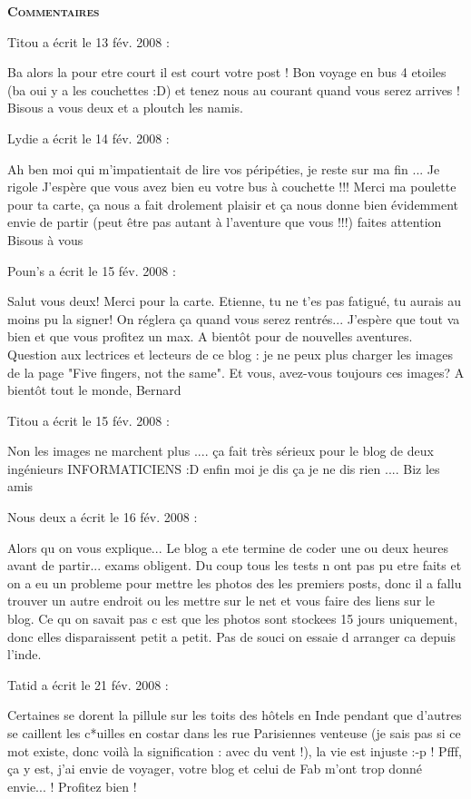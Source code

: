 \bigskip
\textbf{\textsc{Commentaires}}

\medskip
Titou a écrit le 13 fév. 2008 :
\begin{displayquote}
Ba alors la pour etre court il est court votre post ! Bon voyage en bus 4 etoiles (ba oui y a les couchettes :D) et tenez nous au courant quand vous serez arrives ! Bisous a vous deux et a ploutch les namis.
\end{displayquote}

\medskip
Lydie a écrit le 14 fév. 2008 :
\begin{displayquote}
Ah ben moi qui m'impatientait de lire vos péripéties, je reste sur ma fin ...
Je rigole
J'espère que vous avez bien eu votre bus à couchette !!!
Merci ma poulette pour ta carte, ça nous a fait drolement plaisir et ça nous donne bien évidemment envie de partir (peut être pas autant à l'aventure que vous !!!)
faites attention
Bisous à vous
\end{displayquote}

\medskip
Poun's a écrit le 15 fév. 2008 :
\begin{displayquote}
Salut vous deux! Merci pour la carte. Etienne, tu ne t'es pas fatigué, tu aurais au moins pu la signer! On réglera ça quand vous serez rentrés...
J'espère que tout va bien et que vous profitez un max.
A bientôt pour de nouvelles aventures.
Question aux lectrices et lecteurs de ce blog : je ne peux plus charger les images de la page "Five fingers, not the same". Et vous, avez-vous toujours ces images?
A bientôt tout le monde, Bernard
\end{displayquote}

\medskip
Titou a écrit le 15 fév. 2008 :
\begin{displayquote}
Non les images ne marchent plus .... ça fait très sérieux pour le blog de deux ingénieurs INFORMATICIENS :D enfin moi je dis ça je ne dis rien .... Biz les amis
\end{displayquote}

\medskip
Nous deux a écrit le 16 fév. 2008 :
\begin{displayquote}
Alors qu on vous explique...
Le blog a ete termine de coder une ou deux heures avant de partir... exams obligent. Du coup tous les tests n ont pas pu etre faits et on a eu un probleme pour mettre les photos des les premiers posts, donc il a fallu trouver un autre endroit ou les mettre sur le net et vous faire des liens sur le blog. Ce qu on savait pas c est que les photos sont stockees 15 jours uniquement, donc elles disparaissent petit a petit. Pas de souci on essaie d arranger ca depuis l'inde.
\end{displayquote}

\medskip
Tatid a écrit le 21 fév. 2008 :
\begin{displayquote}
Certaines se dorent la pillule sur les toits des hôtels en Inde pendant que d'autres se caillent les c*uilles en costar dans les rue Parisiennes venteuse (je sais pas si ce mot existe, donc voilà la signification : avec du vent !), la vie est injuste :-p !
Pfff, ça y est, j'ai envie de voyager, votre blog et celui de Fab m'ont trop donné envie... ! Profitez bien !
\end{displayquote}

\vfill
